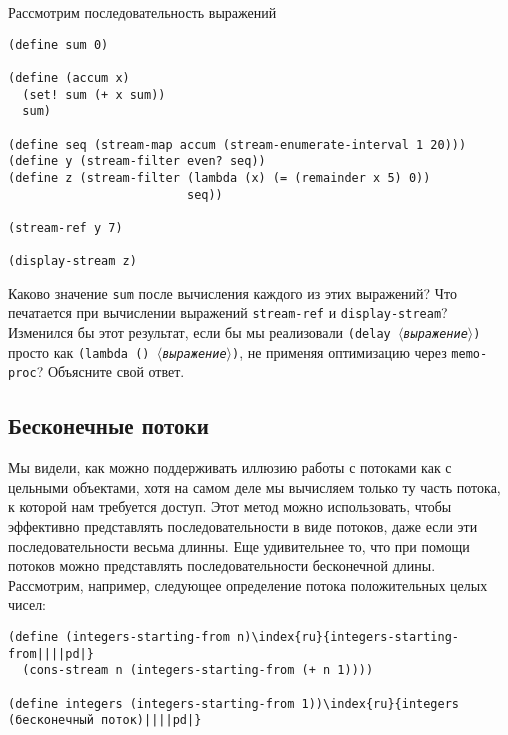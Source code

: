 \begin{exercise}{3.52}\label{EX3.52}%
Рассмотрим последовательность выражений

\begin{Verbatim}[fontsize=\small]
(define sum 0)

(define (accum x)
  (set! sum (+ x sum))
  sum)

(define seq (stream-map accum (stream-enumerate-interval 1 20)))
(define y (stream-filter even? seq))
(define z (stream-filter (lambda (x) (= (remainder x 5) 0))
                         seq))

(stream-ref y 7)

(display-stream z)
\end{Verbatim}
Каково значение {\tt sum} после вычисления каждого из этих
выражений?  Что печатается при вычислении выражений
{\tt stream-ref} и {\tt display-stream}?  Изменился бы
этот результат, если бы мы реализовали
{\tt (delay \textit{$\langle$выражение$\rangle$})} просто как
{\tt (lambda () \textit{$\langle$выражение$\rangle$})}, не применяя
оптимизацию через {\tt memo-proc}? Объясните свой ответ.
\end{exercise}

\subsection{Бесконечные потоки}
\label{INFINITE-STREAMS}


Мы видели, как можно поддерживать иллюзию работы с
потоками как с цельными объектами, хотя на самом деле мы вычисляем
только ту часть потока, к которой нам требуется доступ.  Этот метод
можно использовать, чтобы эффективно представлять последовательности в
виде потоков, даже если эти последовательности весьма длинны.  Еще
удивительнее то, что при помощи потоков можно представлять последовательности
бесконечной длины.  Рассмотрим, например, следующее
определение потока положительных целых чисел:

\begin{Verbatim}[fontsize=\small]
(define (integers-starting-from n)\index{ru}{integers-starting-from||||pd|}
  (cons-stream n (integers-starting-from (+ n 1))))

(define integers (integers-starting-from 1))\index{ru}{integers (бесконечный поток)||||pd|}
\end{Verbatim}

